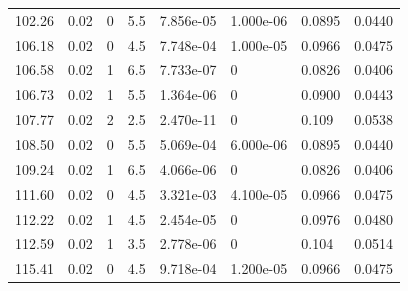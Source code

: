 \documentclass[preview]{standalone}
\begin{document}
{{{\begin{tabular}{L{1.2cm}C{1.2cm} C{0.3cm}C{0.5cm} C{1.4cm}C{1.4cm} C{1.4cm}C{1.4cm}}
  102.26  &  0.02  & 0     & 5.5 &  7.856e-05  & 1.000e-06  & 0.0895 &  0.0440   \\ 
  106.18  &  0.02  & 0     & 4.5 &  7.748e-04  & 1.000e-05  & 0.0966 &  0.0475   \\ 
  106.58  &  0.02  & 1     & 6.5 &  7.733e-07  & 0  & 0.0826 &  0.0406   \\ 
  106.73  &  0.02  & 1     & 5.5 &  1.364e-06  & 0  & 0.0900 &  0.0443   \\ 
  107.77  &  0.02  & 2     & 2.5 &  2.470e-11  & 0  & 0.109 &  0.0538   \\ 
  108.50  &  0.02  & 0     & 5.5 &  5.069e-04  & 6.000e-06  & 0.0895 &  0.0440   \\ 
  109.24  &  0.02  & 1     & 6.5 &  4.066e-06  & 0  & 0.0826 &  0.0406   \\ 
  111.60  &  0.02  & 0     & 4.5 &  3.321e-03  & 4.100e-05  & 0.0966 &  0.0475   \\ 
  112.22  &  0.02  & 1     & 4.5 &  2.454e-05  & 0  & 0.0976 &  0.0480   \\ 
  112.59  &  0.02  & 1     & 3.5 &  2.778e-06  & 0  & 0.104 &  0.0514   \\ 
  115.41  &  0.02  & 0     & 4.5 &  9.718e-04  & 1.200e-05  & 0.0966 &  0.0475   \\ 
\hline 
\end{tabular} 

}}}
\end{document}
